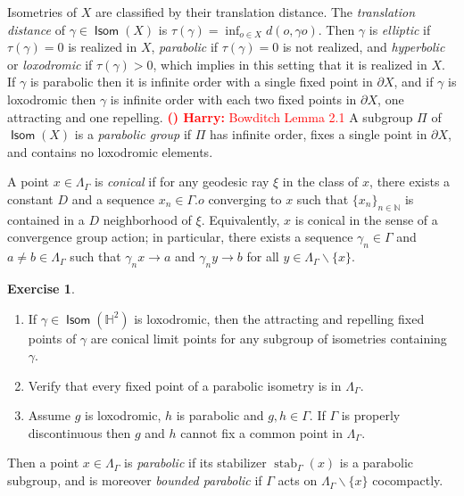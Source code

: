 \documentclass[11pt]{amsart}
\theoremstyle{plain}
\theoremstyle{definition}
\newtheorem{exercise}[proposition]{Exercise}
\theoremstyle{remark}
\DeclareMathOperator{\stab}{stab}
\DeclareMathOperator{\Isom}{\mathsf{Isom}}
\newcounter{countharry}
\newcommand{\comharry}[1]{{\textcolor{red}{\textrm{{\bf (\arabic{countharry})\stepcounter{countharry} Harry:} #1}}}}
\begin{document}
Isometries of $X$ are classified by their translation distance. The
{\em translation distance} of $\gamma\in\Isom(X)$ is
$\tau(\gamma)=\inf_{o\in X}d(o,\gamma o)$. Then $\gamma$ is {\em elliptic}
if $\tau(\gamma)=0$ is realized in $X$, {\em parabolic} if $\tau(\gamma)=0$
is not realized, and {\em hyperbolic} or {\em loxodromic}
if $\tau(\gamma)>0$, which implies in this setting that it is realized in
$X$. If $\gamma$ is parabolic then it is infinite order with a single fixed
point in $\partial X$, and if $\gamma$ is loxodromic then $\gamma$ is
infinite order with each two fixed points in $\partial X$, one attracting
and one repelling. \comharry{Bowditch Lemma 2.1}
A subgroup $\Pi$ of $\Isom(X)$ is a {\em parabolic group} if  $\Pi$ has
infinite order, fixes a single point in $\partial X$, and contains no
loxodromic elements.


A point $x\in\Lambda_\Gamma$ is {\em conical} if for any geodesic ray
$\xi$ in the class of $x$, there exists a constant $D$ and a sequence
$x_n\in\Gamma.o$ converging to $x$ such that $\{x_n\}_{n\in\mathbb
N}$ is contained in a $D$ neighborhood of $\xi$. Equivalently, $x$ is
conical in the sense of a convergence group action; in particular, there
exists a sequence $\gamma_n\in\Gamma$ and $a\neq b\in\Lambda_\Gamma$ such
that $\gamma_n x\to a$ and $\gamma_n y\to b$ for all
$y\in\Lambda_\Gamma\smallsetminus\{x\}$.   

\begin{exercise}
  \begin{enumerate}
    \item 
      If $\gamma\in\Isom(\mathbb H^2)$ is
      loxodromic, then the attracting and repelling fixed points of $\gamma$ are
      conical limit points for any subgroup of isometries containing $\gamma$. 
    \item 
      Verify that every fixed point of a parabolic
      isometry is in $\Lambda_\Gamma$. 
    \item Assume $g$ is loxodromic, $h$ is parabolic and
      $g,h\in\Gamma$. If 
      $\Gamma$ is properly discontinuous then 
      $g$ and $h$ cannot fix a common point in $\Lambda_\Gamma$. 
  \end{enumerate}

\end{exercise}
Then a point $x\in\Lambda_\Gamma$ is {\em parabolic} if its stabilizer
$\stab_\Gamma(x)$ is a parabolic subgroup, and is moreover {\em bounded
parabolic} if $\Gamma$ acts on $\Lambda_\Gamma\smallsetminus\{x\}$
cocompactly. 
\end{document}
